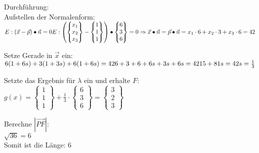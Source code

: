Durchführung: \\
Aufstellen der Normalenform: \\
$
E: (\vec{x} - \vec{p}) \bullet \vec{n} = 0\\
E: 
\begin{pmatrix}
    \begin{Bmatrix}
        x_1 \\ x_2 \\ x_3
    \end{Bmatrix}
    - 
    \begin{Bmatrix}
        1 \\ 1 \\ 1
    \end{Bmatrix}
\end{pmatrix}
\bullet
\begin{Bmatrix}
    6 \\ 3 \\ 6
\end{Bmatrix}
= 0 \\
\Rightarrow
\vec{x} \bullet \vec{n} = \vec{p} \bullet \vec{n} \\
= x_1\cdot 6 + x_2 \cdot 3 + x_3 \cdot 6 = 42
$
\par
Setze Gerade in $\vec{x}$ ein: \\
$
6(1+6s) + 3(1+3s) + 6(1+6s) = 42 \\
6 + 3 + 6 + 6s + 3s + 6s = 42 \\
15 + 81s = 42
s = \frac{1}{3}
$
\par
Setzte das Ergebnis für $\lambda$ ein und erhalte $F$: \\
$
g(x) = 
\begin{Bmatrix}
    1 \\ 1 \\ 1
\end{Bmatrix}
+ \frac{1}{3} \cdot
\begin{Bmatrix}
    6 \\ 3 \\ 6
\end{Bmatrix}
= 
\begin{Bmatrix}
    3 \\ 2 \\ 3
\end{Bmatrix}
$
\par
Berechne $|\overrightarrow{PF}|$: \\
$\sqrt{36} = 6$
\\
Somit ist die Länge: $6$


